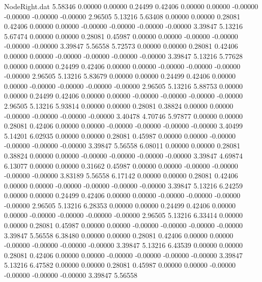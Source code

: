 \begin{filecontents}{NodeRight.dat}
   5.58346    0.00000    0.00000     0.24499    0.42406    0.00000    0.00000   -0.00000   -0.00000   -0.00000   -0.00000    2.96505    5.13216
   5.63408    0.00000    0.00000     0.28081    0.42406    0.00000    0.00000   -0.00000   -0.00000   -0.00000   -0.00000    3.39847    5.13216
   5.67474    0.00000    0.00000     0.28081    0.45987    0.00000    0.00000   -0.00000   -0.00000   -0.00000   -0.00000    3.39847    5.56558
   5.72573    0.00000    0.00000     0.28081    0.42406    0.00000    0.00000   -0.00000   -0.00000   -0.00000   -0.00000    3.39847    5.13216
   5.77628    0.00000    0.00000     0.24499    0.42406    0.00000    0.00000   -0.00000   -0.00000   -0.00000   -0.00000    2.96505    5.13216
   5.83679    0.00000    0.00000     0.24499    0.42406    0.00000    0.00000   -0.00000   -0.00000   -0.00000   -0.00000    2.96505    5.13216
   5.88753    0.00000    0.00000     0.24499    0.42406    0.00000    0.00000   -0.00000   -0.00000   -0.00000   -0.00000    2.96505    5.13216
   5.93814    0.00000    0.00000     0.28081    0.38824    0.00000    0.00000   -0.00000   -0.00000   -0.00000   -0.00000    3.40478    4.70746
   5.97877    0.00000    0.00000     0.28081    0.42406    0.00000    0.00000   -0.00000   -0.00000   -0.00000   -0.00000    3.40499    5.14201
   6.02935    0.00000    0.00000     0.28081    0.45987    0.00000    0.00000   -0.00000   -0.00000   -0.00000   -0.00000    3.39847    5.56558
   6.08011    0.00000    0.00000     0.28081    0.38824    0.00000    0.00000   -0.00000   -0.00000   -0.00000   -0.00000    3.39847    4.69874
   6.13077    0.00000    0.00000     0.31662    0.45987    0.00000    0.00000   -0.00000   -0.00000   -0.00000   -0.00000    3.83189    5.56558
   6.17142    0.00000    0.00000     0.28081    0.42406    0.00000    0.00000   -0.00000   -0.00000   -0.00000   -0.00000    3.39847    5.13216
   6.24259    0.00000    0.00000     0.24499    0.42406    0.00000    0.00000   -0.00000   -0.00000   -0.00000   -0.00000    2.96505    5.13216
   6.28353    0.00000    0.00000     0.24499    0.42406    0.00000    0.00000   -0.00000   -0.00000   -0.00000   -0.00000    2.96505    5.13216
   6.33414    0.00000    0.00000     0.28081    0.45987    0.00000    0.00000   -0.00000   -0.00000   -0.00000   -0.00000    3.39847    5.56558
   6.38480    0.00000    0.00000     0.28081    0.42406    0.00000    0.00000   -0.00000   -0.00000   -0.00000   -0.00000    3.39847    5.13216
   6.43539    0.00000    0.00000     0.28081    0.42406    0.00000    0.00000   -0.00000   -0.00000   -0.00000   -0.00000    3.39847    5.13216
   6.47582    0.00000    0.00000     0.28081    0.45987    0.00000    0.00000   -0.00000   -0.00000   -0.00000   -0.00000    3.39847    5.56558

\end{filecontents}
